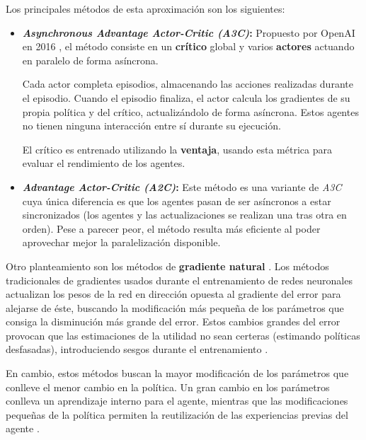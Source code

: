 Los principales métodos de esta aproximación son los siguientes:
\begin{itemize}
	\item \textbf{\textit{Asynchronous Advantage Actor-Critic (A3C)}:} Propuesto por OpenAI en 2016 \cite{DBLP:journals/corr/MnihBMGLHSK16}, el método consiste en un \textbf{crítico} global y varios \textbf{actores} actuando en paralelo de forma asíncrona.
	
	Cada actor completa episodios, almacenando las acciones realizadas durante el episodio. Cuando el episodio finaliza, el actor calcula los gradientes de su propia política y del crítico, actualizándolo de forma asíncrona. Estos agentes no tienen ninguna interacción entre sí durante su ejecución.
	
	El crítico es entrenado utilizando la \textbf{ventaja}, usando esta métrica para evaluar el rendimiento de los agentes.
	
	\item \textbf{\textit{Advantage Actor-Critic (A2C)}:} Este método es una variante de \textit{A3C} \cite{DBLP:journals/corr/MnihBMGLHSK16} cuya única diferencia es que los agentes pasan de ser asíncronos a estar sincronizados (los agentes y las actualizaciones se realizan una tras otra en orden). Pese a parecer peor, el método resulta más eficiente al poder aprovechar mejor la paralelización disponible.
\end{itemize} 

Otro planteamiento son los métodos de \textbf{gradiente natural} \cite{PETERS2008682}. Los métodos tradicionales de gradientes usados durante el entrenamiento de redes neuronales actualizan los pesos de la red en dirección opuesta al gradiente del error para alejarse de éste, buscando la modificación más pequeña de los parámetros que consiga la disminución más grande del error. Estos cambios grandes del error provocan que las estimaciones de la utilidad no sean certeras (estimando políticas desfasadas), introduciendo sesgos durante el entrenamiento \cite{vitay_2020}.

En cambio, estos métodos buscan la mayor modificación de los parámetros que conlleve el menor cambio en la política. Un gran cambio en los parámetros conlleva un aprendizaje interno para el agente, mientras que las modificaciones pequeñas de la política permiten la reutilización de las experiencias previas del agente \cite{vitay_2020}.

